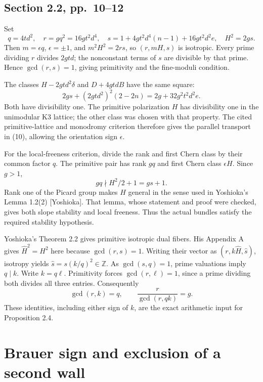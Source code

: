 \documentclass[10pt]{article}
\begin{document}
\subsection*{Section 2.2, pp. 10–12}
Set \[q=4td^2,\quad r=gq^2=16gt^2d^4,\quad
 s=1+4gt^2d^4(n-1)+16gt^2d^2e,\quad H^2=2gs.\] Then \(m=\epsilon q\), \(\epsilon=\pm1\), and \(m^2H^2=2rs\), so \((r,mH,s)\) is isotropic. Every prime dividing \(r\) divides \(2gtd\); the nonconstant terms of \(s\) are divisible by that prime. Hence \(\gcd(r,s)=1\), giving primitivity and the fine-moduli condition.\par
The classes \(H-2gtd^2\delta\) and \(D+4gtdB\) have the same square: \[2gs+(2gtd^2)^2(2-2n)=2g+32g^2t^2d^2e.\] Both have divisibility one. The primitive polarization \(H\) has divisibility one in the unimodular K3 lattice; the other class was chosen with that property. The cited primitive-lattice and monodromy criterion therefore gives the parallel transport in (10), allowing the orientation sign \(\epsilon\).\par
For the local-freeness criterion, divide the rank and first Chern class by their common factor \(q\). The primitive pair has rank \(gq\) and first Chern class \(\epsilon H\). Since \(g>1\), \[gq\nmid H^2/2+1=gs+1.\] Rank one of the Picard group makes \(H\) general in the sense used in Yoshioka’s Lemma 1.2(2) [Yoshioka]. That lemma, whose statement and proof were checked, gives both slope stability and local freeness. Thus the actual bundles satisfy the required stability hypothesis.\par
Yoshioka’s Theorem 2.2 gives primitive isotropic dual fibers. His Appendix A gives \(\widehat H^2=H^2\) here because \(\gcd(r,s)=1\). Writing their vector as \((r,k\widehat H,\widehat s)\), isotropy yields \(\widehat s=s(k/q)^2\in\mathbb Z\). As \(\gcd(s,q)=1\), prime valuations imply \(q\mid k\). Write \(k=q\ell\). Primitivity forces \(\gcd(r,\ell)=1\), since a prime dividing both divides all three entries. Consequently \[\gcd(r,k)=q,\qquad \frac r{\gcd(r,qk)}=g.\] These identities, including either sign of \(k\), are the exact arithmetic input for Proposition 2.4.\par
\section*{Brauer sign and exclusion of a second wall}
\end{document}
